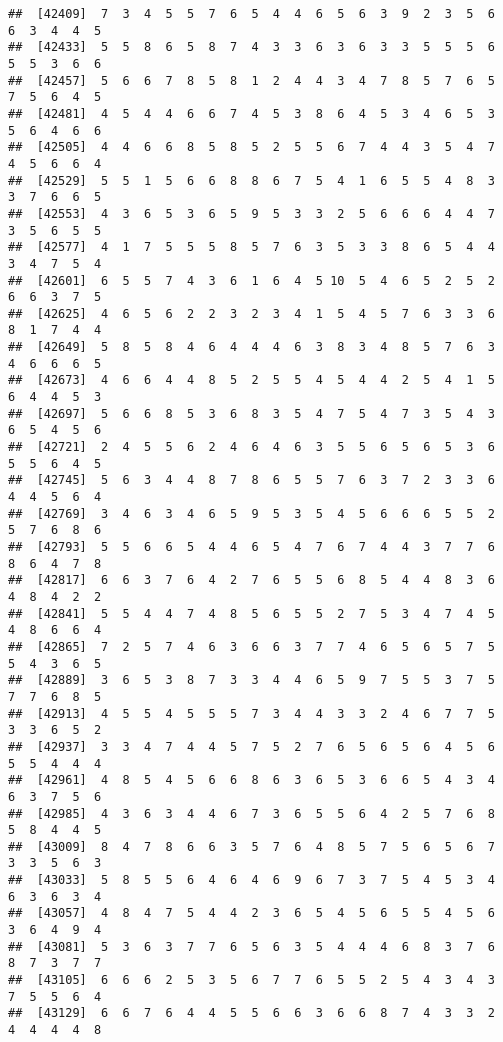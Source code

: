 \documentclass[
]{book}
\begin{document}
\begin{verbatim}
##  [42409]  7  3  4  5  5  7  6  5  4  4  6  5  6  3  9  2  3  5  6  6  3  4  4  5
##  [42433]  5  5  8  6  5  8  7  4  3  3  6  3  6  3  3  5  5  5  6  5  5  3  6  6
##  [42457]  5  6  6  7  8  5  8  1  2  4  4  3  4  7  8  5  7  6  5  7  5  6  4  5
##  [42481]  4  5  4  4  6  6  7  4  5  3  8  6  4  5  3  4  6  5  3  5  6  4  6  6
##  [42505]  4  4  6  6  8  5  8  5  2  5  5  6  7  4  4  3  5  4  7  4  5  6  6  4
##  [42529]  5  5  1  5  6  6  8  8  6  7  5  4  1  6  5  5  4  8  3  3  7  6  6  5
##  [42553]  4  3  6  5  3  6  5  9  5  3  3  2  5  6  6  6  4  4  7  3  5  6  5  5
##  [42577]  4  1  7  5  5  5  8  5  7  6  3  5  3  3  8  6  5  4  4  3  4  7  5  4
##  [42601]  6  5  5  7  4  3  6  1  6  4  5 10  5  4  6  5  2  5  2  6  6  3  7  5
##  [42625]  4  6  5  6  2  2  3  2  3  4  1  5  4  5  7  6  3  3  6  8  1  7  4  4
##  [42649]  5  8  5  8  4  6  4  4  4  6  3  8  3  4  8  5  7  6  3  4  6  6  6  5
##  [42673]  4  6  6  4  4  8  5  2  5  5  4  5  4  4  2  5  4  1  5  6  4  4  5  3
##  [42697]  5  6  6  8  5  3  6  8  3  5  4  7  5  4  7  3  5  4  3  6  5  4  5  6
##  [42721]  2  4  5  5  6  2  4  6  4  6  3  5  5  6  5  6  5  3  6  5  5  6  4  5
##  [42745]  5  6  3  4  4  8  7  8  6  5  5  7  6  3  7  2  3  3  6  4  4  5  6  4
##  [42769]  3  4  6  3  4  6  5  9  5  3  5  4  5  6  6  6  5  5  2  5  7  6  8  6
##  [42793]  5  5  6  6  5  4  4  6  5  4  7  6  7  4  4  3  7  7  6  8  6  4  7  8
##  [42817]  6  6  3  7  6  4  2  7  6  5  5  6  8  5  4  4  8  3  6  4  8  4  2  2
##  [42841]  5  5  4  4  7  4  8  5  6  5  5  2  7  5  3  4  7  4  5  4  8  6  6  4
##  [42865]  7  2  5  7  4  6  3  6  6  3  7  7  4  6  5  6  5  7  5  5  4  3  6  5
##  [42889]  3  6  5  3  8  7  3  3  4  4  6  5  9  7  5  5  3  7  5  7  7  6  8  5
##  [42913]  4  5  5  4  5  5  5  7  3  4  4  3  3  2  4  6  7  7  5  3  3  6  5  2
##  [42937]  3  3  4  7  4  4  5  7  5  2  7  6  5  6  5  6  4  5  6  5  5  4  4  4
##  [42961]  4  8  5  4  5  6  6  8  6  3  6  5  3  6  6  5  4  3  4  6  3  7  5  6
##  [42985]  4  3  6  3  4  4  6  7  3  6  5  5  6  4  2  5  7  6  8  5  8  4  4  5
##  [43009]  8  4  7  8  6  6  3  5  7  6  4  8  5  7  5  6  5  6  7  3  3  5  6  3
##  [43033]  5  8  5  5  6  4  6  4  6  9  6  7  3  7  5  4  5  3  4  6  3  6  3  4
##  [43057]  4  8  4  7  5  4  4  2  3  6  5  4  5  6  5  5  4  5  6  3  6  4  9  4
##  [43081]  5  3  6  3  7  7  6  5  6  3  5  4  4  4  6  8  3  7  6  8  7  3  7  7
##  [43105]  6  6  6  2  5  3  5  6  7  7  6  5  5  2  5  4  3  4  3  7  5  5  6  4
##  [43129]  6  6  7  6  4  4  5  5  6  6  3  6  6  8  7  4  3  3  2  4  4  4  4  8

\end{verbatim}
\end{document}

